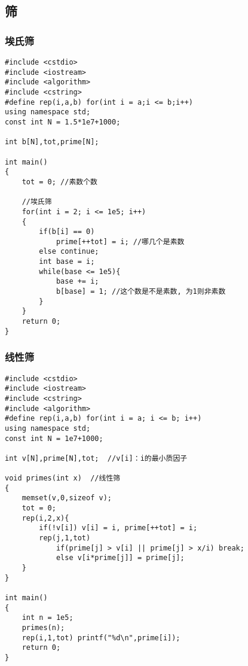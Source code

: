 \documentclass[twoside]{article}
\begin{document}
\subsection{筛}
\subsubsection{埃氏筛}
\begin{lstlisting}
#include <cstdio>
#include <iostream>
#include <algorithm>
#include <cstring>
#define rep(i,a,b) for(int i = a;i <= b;i++)
using namespace std;
const int N = 1.5*1e7+1000;

int b[N],tot,prime[N];

int main()
{
	tot = 0; //素数个数
 
	//埃氏筛
	for(int i = 2; i <= 1e5; i++)
	{
		if(b[i] == 0)
			prime[++tot] = i; //哪几个是素数
		else continue;
		int base = i;
		while(base <= 1e5){
			base += i;
			b[base] = 1; //这个数是不是素数, 为1则非素数
		}
	}
	return 0;
}\end{lstlisting}
\subsubsection{线性筛}
\begin{lstlisting}
#include <cstdio>
#include <iostream>
#include <cstring>
#include <algorithm>
#define rep(i,a,b) for(int i = a; i <= b; i++)
using namespace std;
const int N = 1e7+1000;

int v[N],prime[N],tot;	//v[i]：i的最小质因子

void primes(int x)	//线性筛
{
	memset(v,0,sizeof v);
	tot = 0;
	rep(i,2,x){
		if(!v[i]) v[i] = i, prime[++tot] = i;
		rep(j,1,tot)
			if(prime[j] > v[i] || prime[j] > x/i) break;
			else v[i*prime[j]] = prime[j];
	}
}

int main()
{
	int n = 1e5;
	primes(n);
	rep(i,1,tot) printf("%d\n",prime[i]);
	return 0;
}\end{lstlisting}
\end{document}
